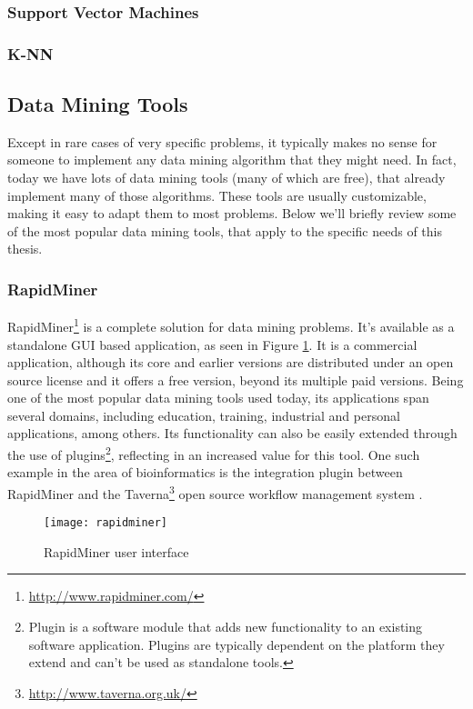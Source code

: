 \subsubsection{Support Vector Machines}

\subsubsection{K-NN}

\subsection{Data Mining Tools}\label{sec:mintools}

Except in rare cases of very specific problems, it typically makes no sense for
someone to implement any data mining algorithm that they might need. In fact,
today we have lots of data mining tools (many of which are free), that already
implement many of those algorithms. These tools are usually customizable, making
it easy to adapt them to most problems. Below we'll briefly review some of the
most popular data mining tools, that apply to the specific needs of this thesis.

\subsubsection{RapidMiner}

RapidMiner\footnote{\url{http://www.rapidminer.com/}} is a complete solution for
data mining problems. It's available as a standalone GUI based application, as
seen in Figure \ref{fig:rapidminer}. It is a commercial application, although
its core and earlier versions are distributed under an open source license and
it offers a free version, beyond its multiple paid versions. Being one of the
most popular data mining tools used today, its applications span several
domains, including education, training, industrial and personal applications,
among others. Its functionality can also be easily extended through the use of
plugins\footnote{Plugin is a software module that adds new functionality to an
existing software application. Plugins are typically dependent on the platform
they extend and can't be used as standalone tools.}, reflecting in an increased
value for this tool. One such example in the area of bioinformatics is the
integration plugin between RapidMiner and the
Taverna\footnote{\url{http://www.taverna.org.uk/}} open source workflow
management system \cite{Jupp2011}.

\begin{figure}[!htb]
  \begin{center}
    \leavevmode
    \texttt{[image: rapidminer]}
    \caption{RapidMiner user interface}
    \label{fig:rapidminer}
  \end{center}
\end{figure}


